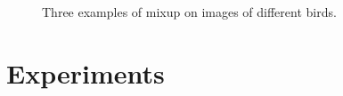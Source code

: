 \documentclass{article}
\begin{document}
\begin{figure}[!htb]
\endminipage
\caption{Three examples of mixup on images of different birds.}
\end{figure}

\section{Experiments}
\end{document}
